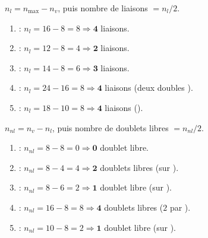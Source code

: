 \documentclass[11pt,a4paper]{article}
\begin{document}
\begin{corrige}
$n_l = n_{\max} - n_v$, puis nombre de liaisons $= n_l/2$.
\begin{enumerate}[label=\alph*)]
  \item {} : $n_l = 16-8 = 8 \Rightarrow \mathbf{4}$ liaisons.
  \item {} : $n_l = 12-8 = 4 \Rightarrow \mathbf{2}$ liaisons.
  \item {} : $n_l = 14-8 = 6 \Rightarrow \mathbf{3}$ liaisons.
  \item {} : $n_l = 24-16 = 8 \Rightarrow \mathbf{4}$ liaisons (deux doubles ).
  \item {} : $n_l = 18-10 = 8 \Rightarrow \mathbf{4}$ liaisons ().
\end{enumerate}
\end{corrige}

\begin{corrige}
$n_{nl} = n_v - n_l$, puis nombre de doublets libres $= n_{nl}/2$.
\begin{enumerate}[label=\alph*)]
  \item {} : $n_{nl} = 8-8 = 0 \Rightarrow \mathbf{0}$ doublet libre.
  \item {} : $n_{nl} = 8-4 = 4 \Rightarrow \mathbf{2}$ doublets libres (sur ).
  \item {} : $n_{nl} = 8-6 = 2 \Rightarrow \mathbf{1}$ doublet libre (sur ).
  \item {} : $n_{nl} = 16-8 = 8 \Rightarrow \mathbf{4}$ doublets libres ($2$ par ).
  \item {} : $n_{nl} = 10-8 = 2 \Rightarrow \mathbf{1}$ doublet libre (sur ).
\end{enumerate}
\end{corrige}
\end{document}
